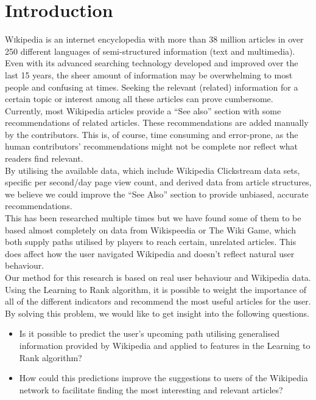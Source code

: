 \section{Introduction}

\lettrine[nindent=0em,lines=3]{W} ikipedia is an internet encyclopedia with more than 38 million articles in over 250 different languages of semi-structured information (text and multimedia). Even with its advanced searching technology developed and improved over the last 15 years, the sheer amount of information may be overwhelming to most people and confusing at times.  Seeking the relevant (related) information for a certain topic or interest among all these articles can prove cumbersome.
Currently, most Wikipedia articles provide a ``See also'' section with some recommendations of related articles. These recommendations are added manually by the contributors. This is, of course, time consuming and error-prone, as the human contributors' recommendations might not be complete nor reflect what readers find relevant. \\
By utilising the available data, which include Wikipedia Clickstream data sets, specific per second/day page view count, and derived data from article structures, we believe we could improve the ``See Also'' section to provide unbiased, accurate recommendations. \\
This has been researched multiple times but we have found some of them to be based almost completely on data from Wikispeedia or The Wiki Game, which both supply paths utilised by players to reach certain, unrelated articles. This does affect how the user navigated Wikipedia and doesn't reflect natural user behaviour. \\
Our method for this research is based on real user behaviour and Wikipedia data. Using the Learning to Rank algorithm, it is possible to weight the importance of all of the different indicators and recommend the most useful articles for the user. By solving this problem, we would like to get insight into the following questions.
\begin{itemize}
\item Is it possible to predict the user's upcoming path utilising generalised information provided by Wikipedia and applied to features in the Learning to Rank algorithm?
\item How could this predictions improve the suggestions to users of the Wikipedia network to facilitate finding the most interesting and relevant articles?
\end{itemize}